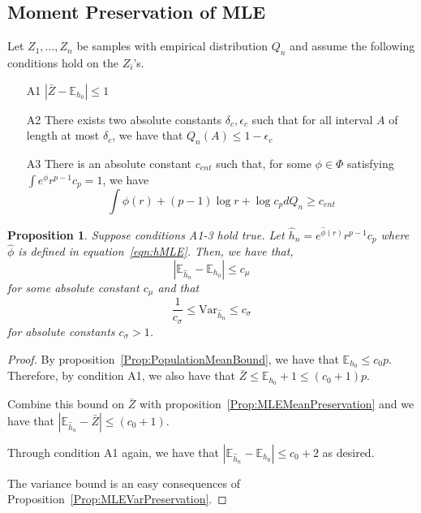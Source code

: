 \documentclass[12pt]{article}
\newtheorem{proposition}[theorem]{Proposition}
\begin{document}
\subsection{Moment Preservation of MLE}


Let $Z_1,...,Z_n$ be samples with empirical distribution $Q_n$ and assume the following conditions hold on the $Z_i$'s. 

\begin{enumerate}
\item[A1] $| \bar{Z} - \mathbb{E}_{h_0} | \leq 1$
\item[A2] There exists two absolute constants $\delta_c, \epsilon_c$ such that for all interval $A$ of length at most $\delta_c$, we have that $Q_n(A) \leq 1 - \epsilon_c$
\item[A3] There is an absolute constant $c_{ent}$ such that, for some $\phi \in \Phi$ satisfying $\int e^{\phi} r^{p-1} c_p = 1$, we have
  \[
    \int \phi(r) + (p-1)\log r + \log c_p dQ_n \geq c_{ent}
  \]
\end{enumerate}


\begin{proposition}
\label{Prop:hhatMeanVarianceBound} 
  Suppose conditions A1-3 hold true. Let $\hat{h}_n = e^{\hat{\phi}(r)} r^{p-1} c_p$ where $\hat{\phi}$ is defined in equation~\ref{eqn:hMLE}. Then, we have that,
  \[
    | \mathbb{E}_{\hat{h}_n} - \mathbb{E}_{h_0} | \leq c_\mu
  \]
 for some absolute constant $c_\mu$ and that
  \[
    \frac{1}{c_\sigma} \leq \textrm{Var}_{\hat{h}_n} \leq c_\sigma
  \]
  for absolute constants $c_\sigma > 1$.
\end{proposition}

\begin{proof}

  By proposition~\ref{Prop:PopulationMeanBound}, we have that $\mathbb{E}_{h_0} \leq c_0 p$. Therefore, by condition A1, we also have that $\bar{Z} \leq \mathbb{E}_{h_0} + 1 \leq (c_0 + 1)p$.

  Combine this bound on $\bar{Z}$ with proposition~\ref{Prop:MLEMeanPreservation} and we have that $| \mathbb{E}_{\hat{h}_n} - \bar{Z} | \leq (c_0 + 1)$.

  Through condition A1 again, we have that $| \mathbb{E}_{\hat{h}_n} - \mathbb{E}_{h_0} | \leq c_0 + 2 $ as desired.


 The variance bound is an easy consequences of Proposition~\ref{Prop:MLEVarPreservation}.
\end{proof}
\end{document}
